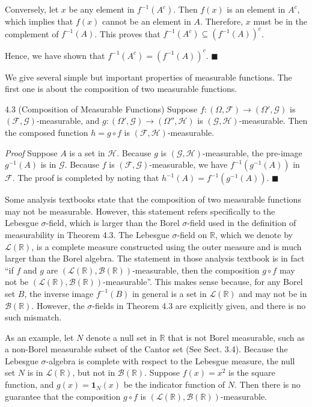 Conversely, let $x$ be any element in $f^{-1}(A^c)$. Then $f(x)$ is an element in $A^c$, which implies that $f(x)$ cannot be an element in $A$. Therefore, $x$ must be in the complement of $f^{-1}(A)$. This proves that $f^{-1}(A^c) \subseteq (f^{-1}(A))^c$.

Hence, we have shown that $f^{-1}(A^c) = (f^{-1}(A))^c$. \hfill $\blacksquare$

We give several simple but important properties of measurable functions. The first one is about the composition of two measurable functions.

\begin{thmbox}{4.3 (Composition of Measurable Functions)}
Suppose $f : (\Omega, \mathcal{F}) \to (\Omega', \mathcal{G})$ is $(\mathcal{F}, \mathcal{G})$-measurable, and $g : (\Omega', \mathcal{G}) \to (\Omega'', \mathcal{H})$ is $(\mathcal{G}, \mathcal{H})$-measurable. Then the composed function $h = g \circ f$ is $(\mathcal{F}, \mathcal{H})$-measurable.
\end{thmbox}

\noindent\textit{Proof} Suppose $A$ is a set in $\mathcal{H}$. Because $g$ is $(\mathcal{G}, \mathcal{H})$-measurable, the pre-image $g^{-1}(A)$ is in $\mathcal{G}$. Because $f$ is $(\mathcal{F}, \mathcal{G})$-measurable, we have $f^{-1}(g^{-1}(A))$ in $\mathcal{F}$. The proof is completed by noting that $h^{-1}(A) = f^{-1}(g^{-1}(A))$. \hfill $\blacksquare$

Some analysis textbooks state that the composition of two measurable functions may not be measurable. However, this statement refers specifically to the Lebesgue $\sigma$-field, which is larger than the Borel $\sigma$-field used in the definition of measurability in Theorem 4.3. The Lebesgue $\sigma$-field on $\mathbb{R}$, which we denote by $\mathcal{L}(\mathbb{R})$, is a complete measure constructed using the outer measure and is much larger than the Borel algebra. The statement in those analysis textbook is in fact ``if $f$ and $g$ are $(\mathcal{L}(\mathbb{R}), \mathcal{B}(\mathbb{R}))$-measurable, then the composition $g \circ f$ may not be $(\mathcal{L}(\mathbb{R}), \mathcal{B}(\mathbb{R}))$-measurable''. This makes sense because, for any Borel set $B$, the inverse image $f^{-1}(B)$ in general is a set in $\mathcal{L}(\mathbb{R})$ and may not be in $\mathcal{B}(\mathbb{R})$. However, the $\sigma$-fields in Theorem 4.3 are explicitly given, and there is no such mismatch.

As an example, let $N$ denote a null set in $\mathbb{R}$ that is not Borel measurable, such as a non-Borel measurable subset of the Cantor set (See Sect. 3.4). Because the Lebesgue $\sigma$-algebra is complete with respect to the Lebesgue measure, the null set $N$ is in $\mathcal{L}(\mathbb{R})$, but not in $\mathcal{B}(\mathbb{R})$. Suppose $f(x) = x^2$ is the square function, and $g(x) = \mathbf{1}_N(x)$ be the indicator function of $N$. Then there is no guarantee that the composition $g \circ f$ is $(\mathcal{L}(\mathbb{R}), \mathcal{B}(\mathbb{R}))$-measurable.

